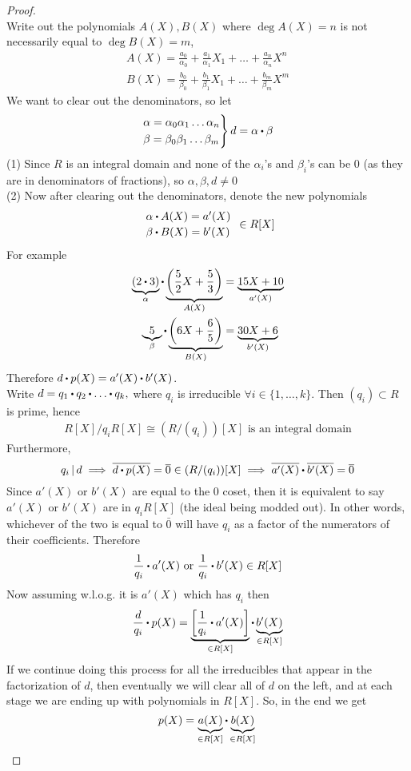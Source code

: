 \documentclass[../Main.tex]{subfiles}
\begin{document}
\begin{proof}~\\
	Write out the polynomials $A(X),B(X)$ where $\deg A(X) =n$ is not necessarily equal to $\deg B(X)=m$,
	\begin{align*}
	A(X)=\frac{a_0}{\alpha_0}+\frac{a_1}{\alpha_1}X_1+\dots +\frac{a_n}{\alpha_n}X^n\\
	B(X)= \frac{b_0}{\beta_0}+\frac{b_1}{\beta_1}X_1+\dots +\frac{b_m}{\beta_m}X^m
	\end{align*}
	We want to clear out the denominators, so let
	\[\begin{rcases*}
	\alpha = \alpha_0\alpha_1\dots\alpha_n\\
	\beta = \beta_0\beta_1\dots\beta_m
	\end{rcases*}d=\alpha\rdot \beta\]
	(1) Since $R$ is an integral domain and none of the $\alpha_i$'s and $\beta_i$'s can be $0$ (as they are in denominators of fractions), so $\alpha,\beta,d\ne 0$\\
	(2) Now after clearing out the denominators, denote the new polynomials 
	\[\begin{array}{l}
		\alpha\rdot A(X)=a'(X)\\[2pt]
		\beta\rdot B(X)=b'(X)
	\end{array}\in R[X]\]
	For example
	\begin{align*}
	\underbrace{(2\rdot 3)}_{\alpha}\rdot \underbrace{\left(\frac{5}{2}X+\frac{5}{3}\right)}_{A(X)}&=\underbrace{15X+10}_{a'(X)}\\ 
	\underbrace{5}_{\beta}\rdot \underbrace{\left(6X+\frac{6}{5}\right)}_{B(X)} &= \underbrace{30X+6}_{b'(X)}
	\end{align*}
	Therefore $d\rdot p(X)=a'(X)\rdot b'(X)$.\\
	Write
	$d=q_1\rdot q_2\rdot \dots\rdot q_k,$ where $q_i$ is irreducible $\forall i\in \{1,\dots,k\} $.
	Then $(q_i)\subset R$ is prime, hence
	\begin{align*}
	R[X]/q_iR[X] \cong (R/(q_i))[X] \text{ is an integral domain}
	\end{align*}
	Furthermore,
	\[\divs{q_i}{d}\implies \obar{d\rdot p(X)}=\obar{0} \in (R/(q_i))[X] \implies \obar{a'(X)}\rdot \obar{ b'(X)} =\obar{0}\]
	Since $a'(X)$ or $b'(X)$ are equal to the $0$ coset, then it is equivalent to say $a'(X)$ or $b'(X)$ are in $q_iR[X]$ (the ideal being modded out). In other words, whichever of the two is equal to $\bar{0}$ will have $q_i$ as a factor of the numerators of their coefficients. Therefore
	\[\frac{1}{q_i}\rdot a'(X) \text{ or } \frac{1}{q_i}\rdot b'(X) \in R[X]\] 
	Now assuming w.l.o.g. it is $a'(X)$ which has $q_i$ then
	 \[\frac{d}{q_i}\rdot p(X)=\underbrace{\left[\frac{1}{q_i}\rdot a'(X)\right]}_{\in R[X]}\rdot \underbrace{b'(X)}_{\in R[X]} \]
	If we continue doing this process for all the irreducibles that appear in the factorization of $d$, then eventually we will clear all of $d$ on the left, and at each stage we are ending up with polynomials in $R[X]$. So, in the end we get
	\[p(X)=\underbrace{a(X)}_{\in R[X]}\rdot \underbrace{b(X)}_{\in R[X]}\qedhere\]
\end{proof}
\end{document}
